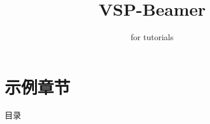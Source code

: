 \documentclass[theme=tutorial-red]{vsp-beamer}
\title[VSP-Beamer]{VSP-Beamer}
\subtitle{for tutorials}
\date{}
\begin{document}
\VSPtitleframe

\section{示例章节}

\begin{frame}{目录}
    \tableofcontents
\end{frame}



\end{document}
